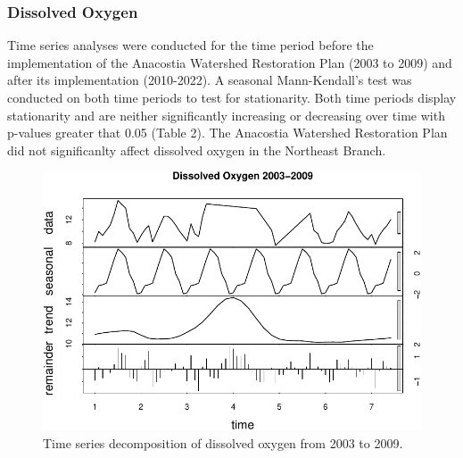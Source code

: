\documentclass[
  12pt,
]{article}
\begin{document}
\newpage

\hypertarget{dissolved-oxygen}{%
\subsubsection{Dissolved Oxygen}\label{dissolved-oxygen}}

Time series analyses were conducted for the time period before the
implementation of the Anacostia Watershed Restoration Plan (2003 to
2009) and after its implementation (2010-2022). A seasonal
Mann-Kendall's test was conducted on both time periods to test for
stationarity. Both time periods display stationarity and are neither
significantly increasing or decreasing over time with p-values greater
that 0.05 (Table 2). The Anacostia Watershed Restoration Plan did not
significanlty affect dissolved oxygen in the Northeast Branch.

\begin{figure}

{\centering \includegraphics{Project_Template_files/figure-latex/Plot of Early Dissolved Oxygen Time Series Decomposition-1} 

}

\caption{Time series decomposition of dissolved oxygen from 2003 to 2009.}\label{fig:Plot of Early Dissolved Oxygen Time Series Decomposition}
\end{figure}
\end{document}
